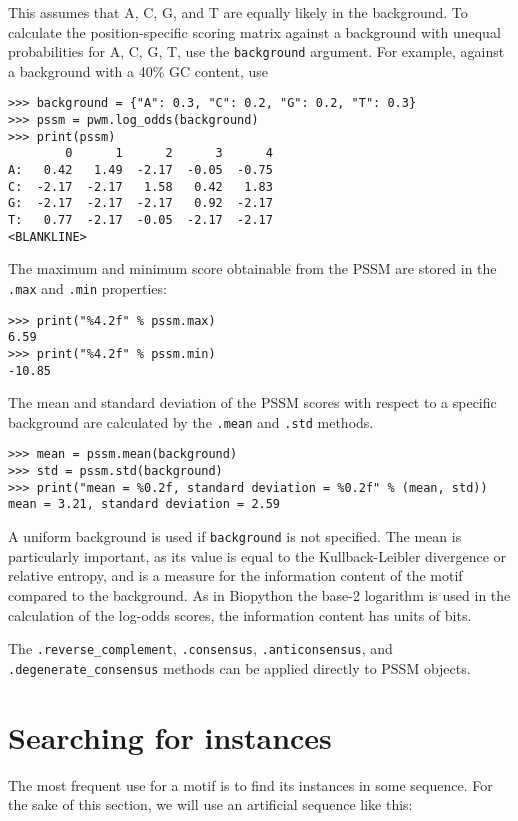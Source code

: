 This assumes that A, C, G, and T are equally likely in the background. To
calculate the position-specific scoring matrix against a background with
unequal probabilities for A, C, G, T, use the \verb+background+ argument.
For example, against a background with a 40\% GC content, use

\begin{verbatim}
>>> background = {"A": 0.3, "C": 0.2, "G": 0.2, "T": 0.3}
>>> pssm = pwm.log_odds(background)
>>> print(pssm)
        0      1      2      3      4
A:   0.42   1.49  -2.17  -0.05  -0.75
C:  -2.17  -2.17   1.58   0.42   1.83
G:  -2.17  -2.17  -2.17   0.92  -2.17
T:   0.77  -2.17  -0.05  -2.17  -2.17
<BLANKLINE>
\end{verbatim}

The maximum and minimum score obtainable from the PSSM are stored in the
\verb+.max+ and \verb+.min+ properties:

\begin{verbatim}
>>> print("%4.2f" % pssm.max)
6.59
>>> print("%4.2f" % pssm.min)
-10.85
\end{verbatim}

The mean and standard deviation of the PSSM scores with respect to a specific
background are calculated by the \verb+.mean+ and \verb+.std+ methods.

\begin{verbatim}
>>> mean = pssm.mean(background)
>>> std = pssm.std(background)
>>> print("mean = %0.2f, standard deviation = %0.2f" % (mean, std))
mean = 3.21, standard deviation = 2.59
\end{verbatim}
A uniform background is used if \verb+background+ is not specified.
The mean is particularly important, as its value is equal to the
Kullback-Leibler divergence or relative entropy, and is a measure for the
information content of the motif compared to the background. As in Biopython
the base-2 logarithm is used in the calculation of the log-odds scores, the
information content has units of bits.

The \verb+.reverse_complement+, \verb+.consensus+, \verb+.anticonsensus+, and
\verb+.degenerate_consensus+ methods can be applied directly to PSSM objects.

\section{Searching for instances}
\label{sec:search}

The most frequent use for a motif is to find its instances in some
sequence. For the sake of this section, we will use an artificial sequence like this:

